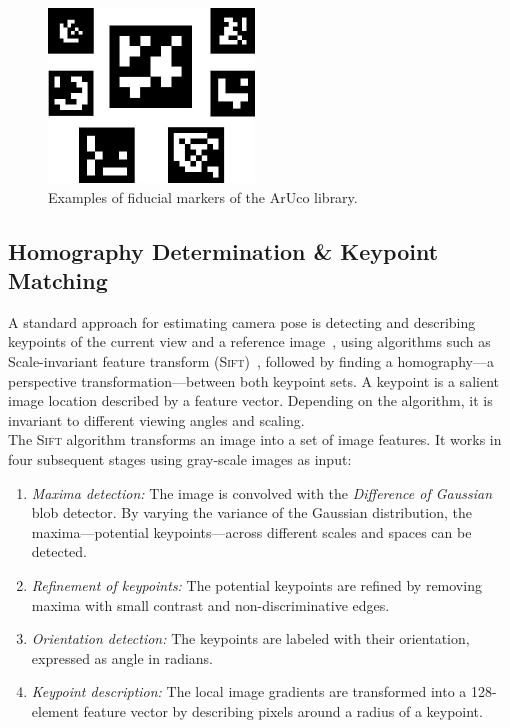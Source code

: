 \documentclass{report}
\begin{document}


\begin{figure}[h!]
\begin{center}
\includegraphics[width=0.252\columnwidth]{markers}
\caption{{\label{fig:aruco}
Examples of fiducial markers of the ArUco library.%
}}
\end{center}
\end{figure}

\subsection{Homography Determination \& Keypoint Matching}
\label{sec:keypointmatching}

A standard approach for estimating camera pose is detecting and
describing keypoints of the current view and a reference
image~\cite{se2002global}, using algorithms such as Scale-invariant
feature transform (\textsc{Sift})~\cite{lowe1999object}, followed by
finding a homography---a perspective transformation---between both
keypoint sets. A keypoint is a salient image location described by a
feature vector. Depending on the algorithm, it is
invariant to different viewing angles and scaling.\\
The \textsc{Sift} algorithm transforms an image into a set of image
features. It works in four subsequent stages using gray-scale images
as input:
\begin{enumerate}
\item \emph{Maxima detection:} The image is convolved with the
  \emph{Difference of Gaussian} blob detector. By varying the variance
  of the Gaussian distribution, the maxima---potential
  keypoints---across different scales and spaces can be detected.
\item \emph{Refinement of keypoints:} The potential keypoints are
  refined by removing maxima with small contrast and non-discriminative
  edges.
\item \emph{Orientation detection:} The keypoints are labeled with
  their orientation, expressed as angle in radians.
\item \emph{Keypoint description:} The local image gradients are
  transformed into a 128-element feature vector by describing pixels
  around a radius of a keypoint.
\end{enumerate}
\end{document}
